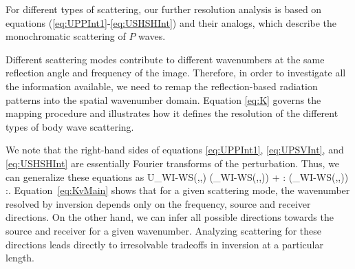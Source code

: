 For different types of scattering, our further resolution analysis is based on equations 
(\ref{eq:UPPInt1}-\ref{eq:USHSHInt}) and their analogs, which describe the monochromatic scattering of $P$ waves.

 

Different scattering modes contribute to different wavenumbers at 
the same reflection angle and frequency of the image. Therefore, in order to investigate all the
information available, we need to remap the reflection-based radiation patterns into 
the spatial wavenumber domain. Equation \eqref{eq:K} governs the mapping procedure and  illustrates how it defines the resolution of the different types of body wave scattering.


We note that the right-hand sides of equations \eqref{eq:UPPInt1}, \eqref{eq:UPSVInt}, and \eqref{eq:USHSHInt} are essentially Fourier transforms of the perturbation. Thus, we can generalize these equations as 
\beq \label{eq:KvMain}
\delta U_{WI-WS}(\sv,\gv,\omega) \propto \spv\cdot\gpv \delta \hat{\rho}(\Kv_{WI-WS}(\sv,\gv,\omega)) + \sv\spv : \delta \hat{\cv}(\Kv_{WI-WS}(\sv,\gv,\omega)) :\gv\gpv.
\eeq
Equation~\eqref{eq:KvMain} shows that for a given scattering mode, the wavenumber resolved by inversion depends only on the frequency, source and receiver directions. On the other hand, we can infer all possible directions towards the source and receiver for a given wavenumber. Analyzing scattering for these directions leads directly to irresolvable tradeoffs in inversion at a particular length.



